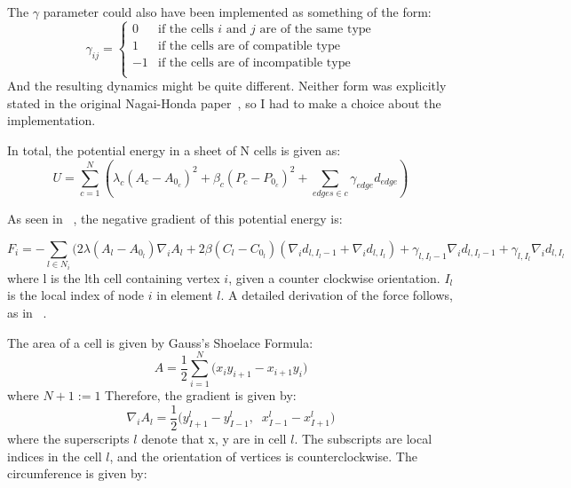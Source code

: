 \begin{enumerate}
The $\gamma$ parameter could also have been implemented as something of the form:
\[  \gamma_{ij} =  \left\{
\begin{array}{ll}
      0 & \textrm{if the cells $i$ and $j$ are of the same type} \\
      1 &  \textrm{if the cells are of compatible type}\\
      -1 & \textrm{if the cells are of incompatible type} \\
\end{array} 
\right. \]
And the resulting dynamics might be quite different. Neither form was explicitly stated in the original Nagai-Honda paper~\cite{HondaNagai}, so I had to make a choice about the implementation.
\end{enumerate}

In total, the potential energy in a sheet of N cells is given as:
\begin{equation*}
U = \sum\limits_{c = 1}^N\left(\lambda_c(A_c - A_{0_c})^2 + \beta_c(P_c - P_{0_c})^2 + \sum_{edges\in c}\gamma_{edge}d_{edge}\right)
\end{equation*}

 As seen in ~\cite{ChasteMain}, the negative gradient of this potential energy is:

\begin{equation}
F_i = -\displaystyle\sum_{l\in N_i}(2\lambda(A_l - A_{0_l})\nabla_iA_l + 2\beta(C_l - C_{0_l})(\nabla_i d_{l, I_l-1}+\nabla_i d_{l, I_l}) + \gamma_{l, I_l-1}\nabla_i d_{l, I_l-1} + \gamma_{l, I_l}\nabla_i d_{l, I_l}
\end{equation} 
where l is the lth cell containing vertex $i$, given a counter clockwise orientation. $I_l$ is the local index of node $i$ in element $l$. A detailed derivation of the force follows, as in ~\cite{ChasteMain}.

 The area of a cell is given by Gauss's Shoelace Formula:
\begin{equation}
A = \frac12\sum\limits_{i=1}^N\Big(x_iy_{i+1}-x_{i+1}y_i\Big)
\end{equation}
where $N+1 := 1$ Therefore, the gradient is given by:
\begin{equation}
\nabla_i A_l = \frac12
\Big(
y^l_{I+1} - y^l_{I-1},\;\;x^l_{I-1} - x^l_{I+1}
\Big)
\end{equation}
 where the superscripts $l$ denote that x, y are in cell $l$. The subscripts are local indices in the cell $l$, and the orientation of vertices is counterclockwise. The circumference is given by:

